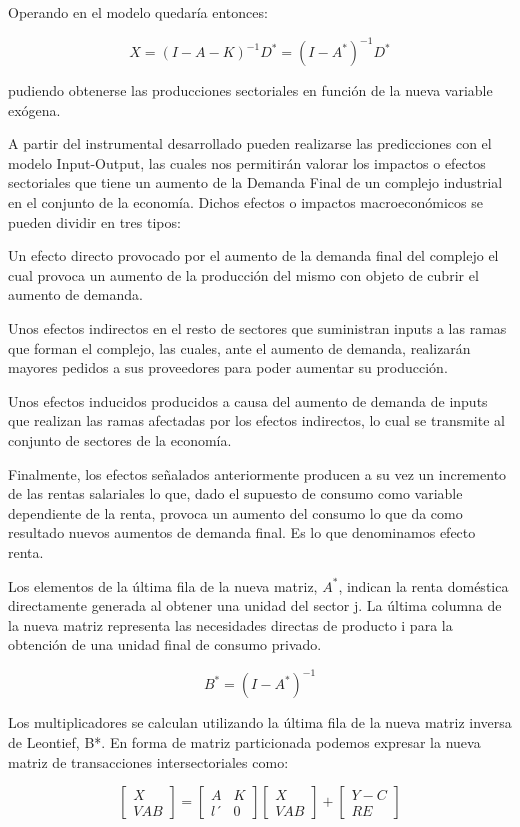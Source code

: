 \documentclass{article}
\begin{document}
Operando en el modelo quedaría entonces:

$$X = (I-A-K)^{-1}D^*=(I-A^*)^{-1}D^*$$

pudiendo obtenerse las producciones sectoriales en función de la nueva variable exógena.

A partir del instrumental desarrollado pueden realizarse las predicciones con el modelo Input-Output, las cuales nos permitirán valorar los impactos o efectos sectoriales que tiene un aumento de la Demanda Final de un complejo industrial en el conjunto de la economía. Dichos efectos o impactos macroeconómicos se pueden dividir en tres tipos:

Un efecto directo provocado por el aumento de la demanda final del complejo el cual provoca un aumento de la producción del mismo con objeto de cubrir el aumento de demanda.

Unos efectos indirectos en el resto de sectores que suministran inputs a las ramas que forman el complejo, las cuales, ante el aumento de demanda, realizarán mayores pedidos a sus proveedores para poder aumentar su producción.

Unos efectos inducidos producidos a causa del aumento de demanda de inputs que realizan las ramas afectadas por los efectos indirectos, lo cual se transmite al conjunto de sectores de la economía.

Finalmente, los efectos señalados anteriormente producen a su vez un incremento de las rentas salariales lo que, dado el supuesto de consumo como variable dependiente de la renta, provoca un aumento del consumo lo que da como resultado nuevos aumentos de demanda final. Es lo que denominamos efecto renta.

Los elementos de la última fila de la nueva matriz, $A^*$, indican la renta doméstica directamente generada al obtener una unidad del sector j. La última columna de la nueva matriz representa las necesidades directas de producto i para la obtención de una unidad final de consumo privado.

$$B^*=(I-A^*)^{-1}$$

Los multiplicadores se calculan utilizando la última fila de la nueva matriz inversa de Leontief, B*. En forma de matriz particionada podemos expresar la nueva matriz de transacciones intersectoriales como:

$$\begin{bmatrix}{X}\\{VAB}\end{bmatrix}=\begin{bmatrix}{A}&{K}\\{l´}&{0}\end{bmatrix}\begin{bmatrix}{X}\\{VAB}\end{bmatrix}+\begin{bmatrix}{Y-C}\\{RE}\end{bmatrix}$$
\end{document}
